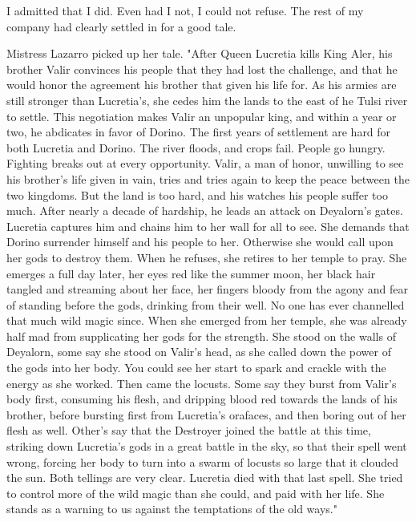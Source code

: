 \documentclass{article}
\begin{document}
I admitted that I did. Even had I not, I could not refuse. The rest of my company had clearly settled in for a good tale. 

Mistress Lazarro picked up her tale. "After Queen Lucretia kills King Aler, his brother Valir convinces his people that they had lost the challenge, and that he would honor the agreement his brother that given his life for. As his armies are still stronger than Lucretia's, she cedes him the lands to the east of he Tulsi river to settle. This negotiation makes Valir an unpopular king, and within a year or two, he abdicates in favor of Dorino. The first years of settlement are hard for both Lucretia and Dorino. The river floods, and crops fail. People go hungry. Fighting breaks out at every opportunity. Valir, a man of honor, unwilling to see his brother's life given in vain, tries and tries again to keep the peace between the two kingdoms. But the land is too hard, and his watches his people suffer too much. After nearly a decade of hardship, he leads an attack on Deyalorn's gates. Lucretia captures him and chains him to her wall for all to see. She demands that Dorino surrender himself and his people to her. Otherwise she would call upon her gods to destroy them. When he refuses, she retires to her temple to pray. She emerges a full day later, her eyes red like the summer moon, her black hair tangled and streaming about her face, her fingers bloody from the agony and fear of standing before the gods, drinking from their well. No one has ever channelled that much wild magic since. When she emerged from her temple, she was already half mad from supplicating her gods for the strength. She stood on the walls of Deyalorn, some say she stood on Valir's head, as she called down the power of the gods into her body. You could see her start to spark and crackle with the energy as she worked. Then came the locusts. Some say they burst from Valir's body first, consuming his flesh, and dripping blood red towards the lands of his brother, before bursting first from Lucretia's orafaces, and then boring out of her flesh as well. Other's say that the Destroyer joined the battle at this time, striking down Lucretia's gods in a great battle in the sky, so that their spell went wrong, forcing her body to turn into a swarm of locusts so large that it clouded the sun. Both tellings are very clear. Lucretia died with that last spell. She tried to control more of the wild magic than she could, and paid with her life. She stands as a warning to us against the temptations of the old ways."
\end{document}
